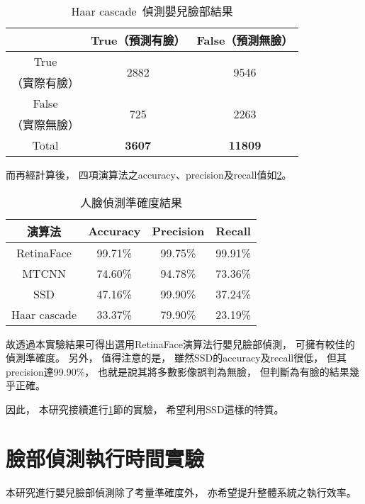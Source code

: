 \documentclass[class=NCU_thesis, crop=false]{standalone}
\begin{document}
\begin{table}[h]
    \centering
    \caption{Haar cascade~\cite{goyal_face_2017}偵測嬰兒臉部結果}
    \label{table:table-opencv}
    \begin{tabular}{ccc}
    \hline
     & True（預測有臉）& False（預測無臉）\\
    \hline
    True & \multirow{2}{*}{2882} & \multirow{2}{*}{9546} \\
    （實際有臉）& & \\
    False & \multirow{2}{*}{725} & \multirow{2}{*}{2263} \\
    （實際無臉）&  & \\
    \hline
    Total & \textbf{3607} & \textbf{11809} \\
    \hline
    \end{tabular}
\end{table}

而再經計算後，
四項演算法之accuracy、precision及recall值如\cref{table:table-face-detection-accuracy}。

\begin{table}[h]
    \centering
    \caption{人臉偵測準確度結果}
    \label{table:table-face-detection-accuracy}
    \begin{tabular}{cccc}
    \hline
    演算法 & Accuracy & Precision & Recall \\
    \hline
    RetinaFace & 99.71\% & 99.75\% & 99.91\% \\
    MTCNN & 74.60\% & 94.78\% & 73.36\% \\
    SSD & 47.16\% & 99.90\% & 37.24\% \\
    Haar cascade & 33.37\% & 79.90\% & 23.19\% \\
    \hline
    \end{tabular}
\end{table}

故透過本實驗結果可得出選用RetinaFace演算法行嬰兒臉部偵測，
可擁有較佳的偵測準確度。
另外，
值得注意的是，
雖然SSD的accuracy及recall很低，
但其precision達99.90\%，
也就是說其將多數影像誤判為無臉，
但判斷為有臉的結果幾乎正確。

因此，
本研究接續進行\ref{sec:chapter_experiment_face_time}節的實驗，
希望利用SSD這樣的特質。

\section{臉部偵測執行時間實驗}
\label{sec:chapter_experiment_face_time}
本研究進行嬰兒臉部偵測除了考量準確度外，
亦希望提升整體系統之執行效率。
\end{document}
